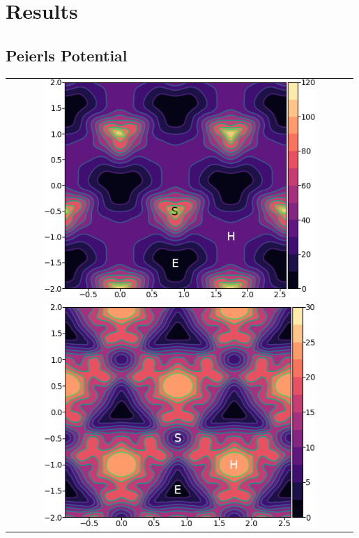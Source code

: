 \documentclass[a4paper,11pt]{article}
\begin{document}
\section{Results}
\label{sec:orgd989621}

\subsection{Peierls Potential}
\label{sec:org91da727}

        \begin{table}
    \begin{tabular}{c}
	     \includegraphics[width=0.8\textwidth]{../Images/itakura_dislocation_energy_landscape_2_labelled.png} \\
             \includegraphics[width=0.8\textwidth]{../Images/tbe_dislocation_energy_landscape_pure_labelled.png}  \\
    \end{tabular}		

\end{table}
\end{document}
